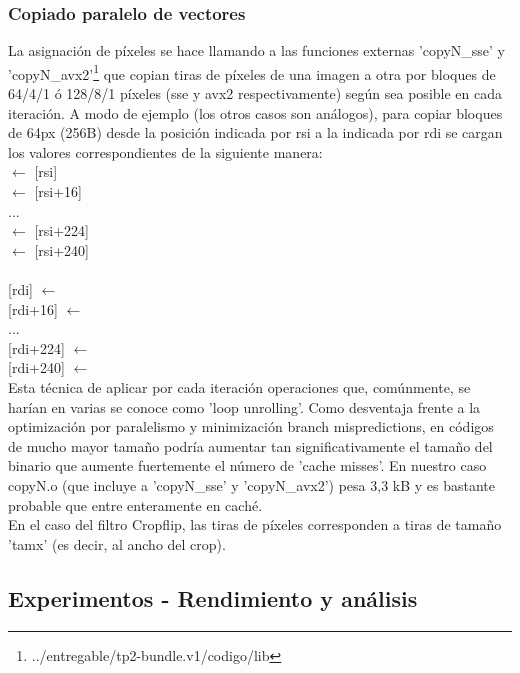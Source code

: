 \subsubsection{Copiado paralelo de vectores}
\label{explicacionCopyN}

La asignación de píxeles se hace llamando a las funciones externas 'copyN_sse' y 'copyN_avx2'\footnote{../entregable/tp2-bundle.v1/codigo/lib} que copian tiras de píxeles de una imagen a otra por bloques de 64/4/1 ó 128/8/1 píxeles (sse y avx2 respectivamente) según sea posible en cada iteración. A modo de ejemplo (los otros casos son análogos), para copiar bloques de 64px (256B) desde la posición indicada por rsi a la indicada por rdi se cargan los valores correspondientes de la siguiente manera:
\newline
\\
 $\leftarrow$ {[rsi]} \\
 $\leftarrow$ {[rsi+16]} \\
... \\
 $\leftarrow$ {[rsi+224]}  \\
 $\leftarrow$ {[rsi+240]} \\
\\
{[rdi]} $\leftarrow$  \\
{[rdi+16]} $\leftarrow$  \\
... \\
{[rdi+224]} $\leftarrow$  \\
{[rdi+240]} $\leftarrow$  \\

Esta técnica de aplicar por cada iteración operaciones que, comúnmente, se harían en varias se conoce como 'loop unrolling'. Como desventaja frente a la optimización por paralelismo y minimización branch mispredictions, en códigos de mucho mayor tamaño podría aumentar tan significativamente el tamaño del binario que aumente fuertemente el número de 'cache misses'. En nuestro caso copyN.o (que incluye a 'copyN_sse' y 'copyN_avx2') pesa 3,3 kB y es bastante probable que entre enteramente en caché.
\\

En el caso del filtro Cropflip, las tiras de píxeles corresponden a tiras de tamaño 'tamx' (es decir, al ancho del crop).  


\subsection{Experimentos - Rendimiento y análisis}

